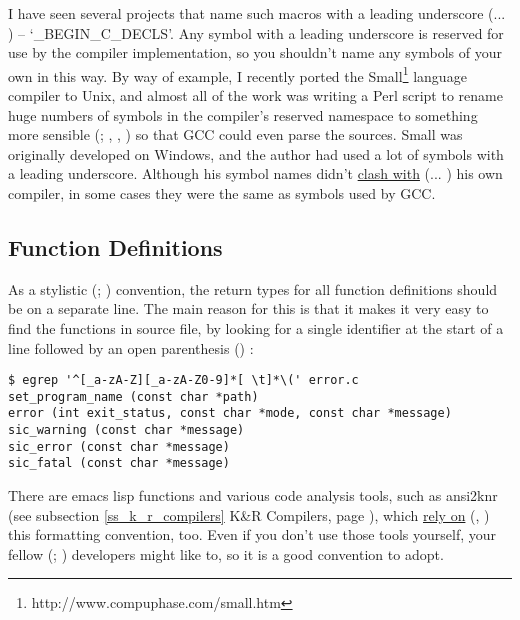I have seen several projects that name such macros with a leading 
underscore ({\MaQ{}}... {\MaQ{}}) -- `\_{}BEGIN\_{}C\_{}DECLS'. Any symbol with a 
leading underscore 
is reserved for use by the compiler implementation, so you shouldn't name 
any symbols of your own in this way. By way of example, I recently 
ported the Small\footnote{http://www.compuphase.com/small.htm }
language compiler to Unix, and almost all of the 
work was writing a Perl script to rename huge numbers of symbols in the 
compiler's reserved namespace to something more
sensible ({\MbQ{}}; {\MaQ{}}, {\MbQ{}}, {\MaQ{}}) so that GCC could 
even parse the sources. Small was originally developed on Windows, and the 
author had used a lot of symbols with a leading underscore. Although his 
symbol names didn't \underline{clash with} ({\McQ{}}... {\MiQ{}}) his own compiler,
in some cases they were 
the same as symbols used by GCC. 


\subsection{Function Definitions}


As a stylistic ({\MrQ{}}; {\MbQ{}}) convention, the return types for all 
function definitions should be on a separate line. The main reason for this is 
that it makes it very easy to find the functions in source file, by looking 
for a single identifier at the start of a line followed by an open 
parenthesis ({\MaQ{}}) : 


\begin{Verbatim}[frame=single]
$ egrep '^[_a-zA-Z][_a-zA-Z0-9]*[ \t]*\(' error.c
set_program_name (const char *path)
error (int exit_status, const char *mode, const char *message)
sic_warning (const char *message)
sic_error (const char *message)
sic_fatal (const char *message)
\end{Verbatim}



There are emacs lisp functions and various code analysis tools, such as 
ansi2knr (see subsection \ref{ss_k_r_compilers} K\&R Compilers,
page \pageref{ss_k_r_compilers}), which \underline{rely on} ({\MaQ{}}, {\MaQ{}})
this formatting convention, too. Even if you don't use those tools yourself,
your fellow ({\MdQ{}}; {\MaQ{}}) developers might like to,
so it is a good convention to adopt. 

